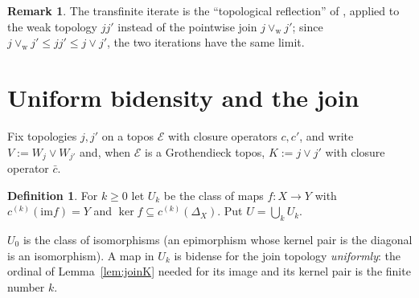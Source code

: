 \documentclass[11pt]{amsart}
\theoremstyle{definition}
\newtheorem{defi}[thm]{Definition}
\newtheorem{rem}[thm]{Remark}
\newcommand{\im}{\mathrm{im}}
\newcommand{\cE}{\mathcal E}
\begin{document}
\begin{rem}
The transfinite iterate is the ``topological reflection'' of
\cite[Cor.~4.2, Prop.~4.3]{KM}, applied to the weak topology $jj'$ instead
of the pointwise join $j\vee_{\mathrm w}j'$; since $j\vee_{\mathrm w}j'\le
jj'\le j\vee j'$, the two iterations have the same limit.
\end{rem}

\section{Uniform bidensity and the join}\label{sec:uniform}

Fix topologies $j,j'$ on a topos $\cE$ with closure operators $c,c'$, and
write $V:=W_j\vee W_{j'}$ and, when $\cE$ is a Grothendieck topos,
$K:=j\vee j'$ with closure operator $\bar c$.

\begin{defi}
For $k\ge0$ let $U_k$ be the class of maps $f\colon X\to Y$ with
$c^{(k)}(\im f)=Y$ and $\ker f\subseteq c^{(k)}(\Delta_X)$. Put
$U=\bigcup_kU_k$.
\end{defi}

$U_0$ is the class of isomorphisms (an epimorphism whose kernel pair is the
diagonal is an isomorphism). A map in $U_k$ is bidense for the join topology
\emph{uniformly}: the ordinal of Lemma~\ref{lem:joinK} needed for its image
and its kernel pair is the finite number $k$.
\end{document}
